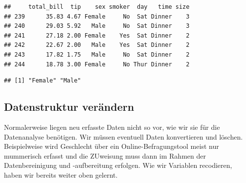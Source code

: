\documentclass[10pt,ngerman,onside]{article}
\newenvironment{Shaded}{\begin{snugshade}}{\end{snugshade}}
\newcommand{\KeywordTok}[1]{\textcolor[rgb]{0.13,0.29,0.53}{\textbf{#1}}}
\newcommand{\CommentTok}[1]{\textcolor[rgb]{0.56,0.35,0.01}{\textit{#1}}}
\newcommand{\OperatorTok}[1]{\textcolor[rgb]{0.81,0.36,0.00}{\textbf{#1}}}
\newcommand{\NormalTok}[1]{#1}
\begin{document}
\begin{verbatim}
##     total_bill  tip    sex smoker  day   time size
## 239      35.83 4.67 Female     No  Sat Dinner    3
## 240      29.03 5.92   Male     No  Sat Dinner    3
## 241      27.18 2.00 Female    Yes  Sat Dinner    2
## 242      22.67 2.00   Male    Yes  Sat Dinner    2
## 243      17.82 1.75   Male     No  Sat Dinner    2
## 244      18.78 3.00 Female     No Thur Dinner    2
\end{verbatim}

\begin{Shaded}
\end{Shaded}

\begin{verbatim}
## [1] "Female" "Male"
\end{verbatim}

\hypertarget{datenstruktur-verandern}{%
\subsection{Datenstruktur verändern}\label{datenstruktur-verandern}}

Normalerweise liegen neu erfasste Daten nicht so vor, wie wir sie für
die Datenanalyse benötigen. Wir müssen eventuell Daten konvertieren und
löschen. Beispielweise wird Geschlecht über ein Online-Befragungstool
meist nur mummerisch erfasst und die ZUweisung muss dann im Rahmen der
Datenbereinigung und -aufbereitung erfolgen. Wie wir Variablen
recodieren, haben wir bereits weiter oben gelernt.

\begin{Shaded}
\end{Shaded}
\end{document}
